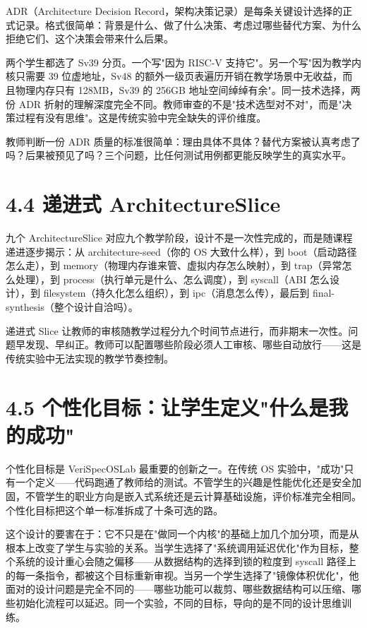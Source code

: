 \documentclass[UTF8,a4paper,12pt,openany]{ctexrep}
\begin{document}
ADR（Architecture Decision Record，架构决策记录）是每条关键设计选择的正式记录。格式很简单：背景是什么、做了什么决策、考虑过哪些替代方案、为什么拒绝它们、这个决策会带来什么后果。

两个学生都选了 Sv39 分页。一个写"因为 RISC-V 支持它"。另一个写"因为教学内核只需要 39 位虚地址，Sv48 的额外一级页表遍历开销在教学场景中无收益，而且物理内存只有 128MB，Sv39 的 256GB 地址空间绰绰有余"。同一技术选择，两份 ADR 折射的理解深度完全不同。教师审查的不是"技术选型对不对"，而是"决策过程有没有思维"。这是传统实验中完全缺失的评价维度。

教师判断一份 ADR 质量的标准很简单：理由具体不具体？替代方案被认真考虑了吗？后果被预见了吗？三个问题，比任何测试用例都更能反映学生的真实水平。

\section{4.4 递进式 ArchitectureSlice}\label{44-ux9012ux8fdbux5f0f-architectureslice}

九个 ArchitectureSlice 对应九个教学阶段，设计不是一次性完成的，而是随课程递进逐步揭示：从 architecture-seed（你的 OS 大致什么样），到 boot（启动路径怎么走），到 memory（物理内存谁来管、虚拟内存怎么映射），到 trap（异常怎么处理），到 process（执行单元是什么、怎么调度），到 syscall（ABI 怎么设计），到 filesystem（持久化怎么组织），到 ipc（消息怎么传），最后到 final-synthesis（整个设计自洽吗）。

递进式 Slice 让教师的审核随教学过程分九个时间节点进行，而非期末一次性。问题早发现、早纠正。教师可以配置哪些阶段必须人工审核、哪些自动放行------这是传统实验中无法实现的教学节奏控制。

\section{4.5 个性化目标：让学生定义"什么是我的成功"}\label{45-ux4e2aux6027ux5316ux76eeux6807ux8ba9ux5b66ux751fux5b9aux4e49ux4ec0ux4e48ux662fux6211ux7684ux6210ux529f}

个性化目标是 VeriSpecOSLab 最重要的创新之一。在传统 OS 实验中，"成功"只有一个定义------代码跑通了教师给的测试。不管学生的兴趣是性能优化还是安全加固，不管学生的职业方向是嵌入式系统还是云计算基础设施，评价标准完全相同。个性化目标把这个单一标准拆成了十条可选的路。

这个设计的要害在于：它不只是在"做同一个内核"的基础上加几个加分项，而是从根本上改变了学生与实验的关系。当学生选择了"系统调用延迟优化"作为目标，整个系统的设计重心会随之偏移------从数据结构的选择到锁的粒度到 syscall 路径上的每一条指令，都被这个目标重新审视。当另一个学生选择了"镜像体积优化"，他面对的设计问题是完全不同的------哪些功能可以裁剪、哪些数据结构可以压缩、哪些初始化流程可以延迟。同一个实验，不同的目标，导向的是不同的设计思维训练。
\end{document}
